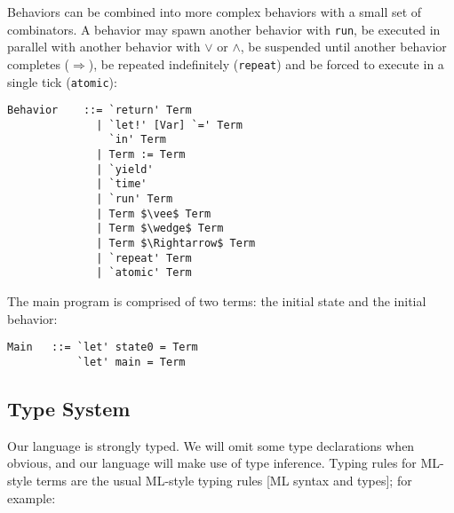 Behaviors can be combined into more complex behaviors with a small set of combinators. A behavior may spawn another behavior with \texttt{run}, be executed in parallel with another behavior with $\vee$ or $\wedge$, be suspended until another behavior completes ($\Rightarrow$), be repeated indefinitely (\texttt{repeat}) and be forced to execute in a single tick (\texttt{atomic}):

\begin{lstlisting}
Behavior    ::= `return' Term
              | `let!' [Var] `=' Term
                `in' Term
              | Term := Term
              | `yield'
              | `time'
              | `run' Term
              | Term $\vee$ Term
              | Term $\wedge$ Term
              | Term $\Rightarrow$ Term
              | `repeat' Term
              | `atomic' Term
\end{lstlisting}

The main program is comprised of two terms: the initial state and the initial behavior:

\begin{lstlisting}
Main   ::= `let' state0 = Term
           `let' main = Term
\end{lstlisting}


\subsection{Type System}
Our language is strongly typed. We will omit some type declarations when obvious, and our language will make use of type inference. Typing rules for ML-style terms are the usual ML-style typing rules [ML syntax and types]; for example:


